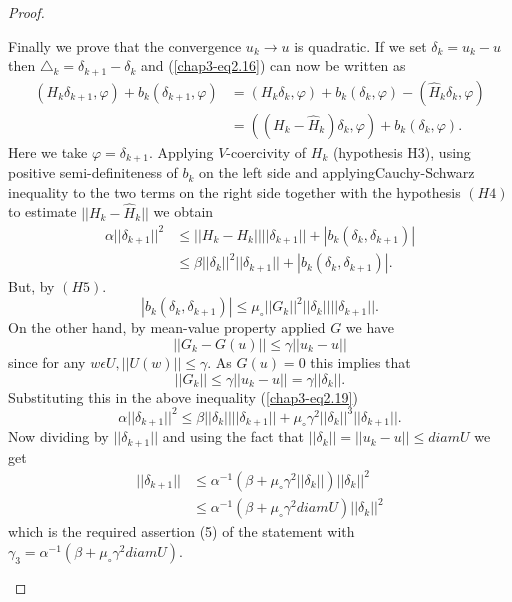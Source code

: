 \begin{proof}
\begin{step}%
Finally we prove that the convergence $u_{k} \to u$ is quadratic. If we set $\delta_{k} = u_{k}-u$ then $\triangle_{k} = \delta_{k+1} - \delta_{k}$ and (\ref{chap3-eq2.16}) can now be written as
\begin{align*}
(H_{k} \delta_{k+1}, \varphi) + b_{k} (\delta_{k+1}, \varphi) & = (H_{k} \delta_{k}, \varphi) + b_{k} (\delta_{k}, \varphi) - (\hat{H}_{k} \delta_{k}, \varphi)\\
& = ((H_{k} - \hat{H}_{k}) \delta_{k}, \varphi) + b_{k} (\delta_{k}, \varphi).
\end{align*}
Here we take $\varphi = \delta_{k+1}$. Applying $V$-coercivity of
$H_{k}$ (hypothesis H3), using positive semi-definiteness of $b_{k}$
on the left side and applying\break Cauchy-Schwarz inequality to the two terms on the right side together with the hypothesis $(H4)$ to estimate $||H_{k} - \hat{H}_{k}||$ we obtain
\begin{align*}
\alpha||\delta_{k+1}||^{2} & \leq ||H_{k}-H_{k}|| ||\delta_{k+1}|| + |b_{k}(\delta_{k}, \delta_{k+1})|\tag{2.19}\label{chap3-eq2.19}\\
& \leq \beta ||\delta_{k}||^{2} ||\delta_{k+1}|| + |b_{k}(\delta_{k}, \delta_{k+1})|.
\end{align*}\pageoriginale
But, by $(H5)$.
\begin{equation*}
|b_{k} (\delta_{k}, \delta_{k+1})| \leq \mu_{\circ} ||G_{k}||^{2} ||\delta_{k}|| ||\delta_{k+1}||.\tag{2.20}\label{chap3-eq2.20}
\end{equation*}
On the other hand, by mean-value property applied $G$ we have
$$
||G_{k}-G(u)|| \leq \gamma ||u_{k}-u||
$$
since for any $w \epsilon U, ||U(w)|| \leq \gamma$. As $G(u) = 0$ this implies that
\begin{equation*}
||G_{k}|| \leq \gamma ||u_{k}-u|| = \gamma ||\delta_{k}||.\tag{2.21}\label{chap3-eq2.21}
\end{equation*}
Substituting this in the above inequality (\ref{chap3-eq2.19})
$$
\alpha ||\delta_{k+1}||^{2} \leq \beta ||\delta_{k}|| ||\delta_{k+1}|| + \mu_{\circ} \gamma^{2} ||\delta_{k}||^{3} ||\delta_{k+1}||.
$$
Now dividing by $||\delta_{k+1}||$ and using the fact that $||\delta_{k}|| = ||u_{k}-u|| \leq diam U$ we get
\begin{align*}
||\delta_{k+1}||  & \leq \alpha^{-1} (\beta + \mu_{\circ} \gamma^{2} ||\delta_{k}||) ||\delta_{k}||^{2}\\
& \leq \alpha^{-1} (\beta + \mu_{\circ} \gamma^{2} diam U) ||\delta_{k}||^{2}
\end{align*}
which is the required assertion (5) of the statement with $\gamma_{3} = \alpha^{-1} (\beta + \mu_{\circ} \gamma^{2} diam U)$.


\end{step}
\end{proof}
